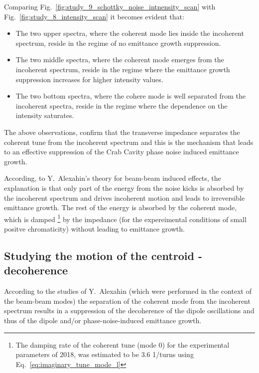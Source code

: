 Comparing Fig.~\ref{fig:study_9_schottky_noise_intnensity_scan} with Fig.~\ref{fig:study_8_intensity_scan} it becomes evident that:
\begin{itemize}
    \item The two upper spectra, where the coherent mode lies inside the incoherent spectrum, reside in the regime of no emittance growth suppression.
    \item The two middle spectra, where the coherent mode emerges from the incoherent spectrum, reside in the regime where the emittance growth suppression increases for higher intensity values.
    \item The two bottom spectra, where the cohere mode is well separated from the incoherent spectra, reside in the regime where the dependence on the intensity saturates.
\end{itemize}

The above observations, confirm that the transverse impedance separates the coherent tune from the incoherent spectrum and this is the mechanism that leads to an effective suppression of the Crab Cavity phase noise induced emittance growth.

According, to Y.~Alexahin's theory for beam-beam induced effects, the explanation is that only part of the energy from the noise kicks is absorbed by the incoherent spectrum and drives incoherent motion and leads to irreversible emittance growth. The rest of the energy is absorbed by the coherent mode, which is damped \footnote{The damping rate of the coherent tune (mode 0) for the experimental parameters of 2018, was estimated to be 3.6 1/turns using Eq.~\eqref{eq:imaginary_tune_mode_l}} by the impedance (for the expereimental conditions of small positve chromaticity) without leading to emittance growth.



\subsection{Studying the motion of the centroid - decoherence}
According to the studies of Y.~Alexahin (which were performed in the context of the beam-beam modes) the separation of the coherent mode from the incoherent spectrum results in a suppression of the decoherence of the dipole oscillations and thus of the dipole and/or phase-noise-induced emittance growth. 


